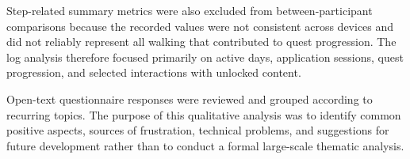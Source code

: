 Step-related summary metrics were also excluded from between-participant
comparisons because the recorded values were not consistent across devices
and did not reliably represent all walking that contributed to quest
progression. The log analysis therefore focused primarily on active days,
application sessions, quest progression, and selected interactions with
unlocked content.

Open-text questionnaire responses were reviewed and grouped according to recurring topics. The purpose of this qualitative analysis was to identify common positive aspects, sources of frustration, technical problems, and suggestions for future development rather than to conduct a formal large-scale thematic analysis.
